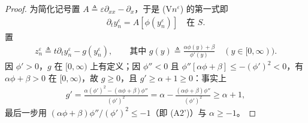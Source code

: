 \documentclass[../../main.tex]{subfiles}%
\begin{document}
\begin{proof}
为简化记号置 $A\triangleq\varepsilon\partial_{xx}-\partial_x$，于是 (V$n^\varepsilon$) 的第一式即
\begin{align*}
\partial_ty_n^\varepsilon=A[\phi(y_n^\varepsilon)]\quad\text{在 }S .
\end{align*}
置
\begin{align*}
z_n^\varepsilon\triangleq t\partial_ty_n^\varepsilon-g(y_n^\varepsilon),\qquad\text{其中 }
g(y)\triangleq\frac{\alpha\phi(y)+\beta}{\phi'(y)}\quad(y\in[0,\infty)).
\end{align*}
因 $\phi'>0$，$g$ 在 $[0,\infty)$ 上有定义；因 $\phi''<0$ 且 $\phi''[\alpha\phi+\beta]\leqslant-(\phi')^2<0$，有 $\alpha\phi+\beta>0$ 在 $[0,\infty)$，故 $g\geqslant0$，且 $g'\geqslant\alpha+1\geqslant0$：事实上
\begin{align*}
g'=\frac{\alpha(\phi')^2-(\alpha\phi+\beta)\phi''}{(\phi')^2}=\alpha-\frac{(\alpha\phi+\beta)\phi''}{(\phi')^2}\geqslant\alpha+1,
\end{align*}
最后一步用 $(\alpha\phi+\beta)\phi''/(\phi')^2\leqslant-1$（即 (A2')）与 $\alpha\geqslant-1$。


\end{proof}
\end{document}
